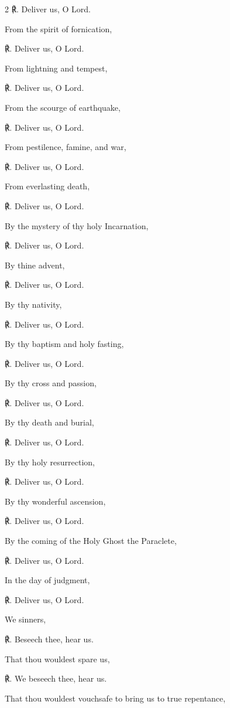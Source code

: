 \begin{multicols}{2}
℟. Deliver us, O Lord.\par\noindent
From the spirit of fornication,\par
℟. Deliver us, O Lord.\par\noindent
From lightning and tempest,\par
℟. Deliver us, O Lord.\par\noindent
From the scourge of earthquake,\par
℟. Deliver us, O Lord.\par\noindent
From pestilence, famine, and war,\par
℟. Deliver us, O Lord.\par\noindent
From everlasting death,\par
℟. Deliver us, O Lord.\par\noindent
By the mystery of thy holy Incarnation,\par
℟. Deliver us, O Lord.\par\noindent
By thine advent,\par
℟. Deliver us, O Lord.\par\noindent
By thy nativity,\par
℟. Deliver us, O Lord.\par\noindent
By thy baptism and holy fasting,\par
℟. Deliver us, O Lord.\par\noindent
By thy cross and passion,\par
℟. Deliver us, O Lord.\par\noindent
By thy death and burial,\par
℟. Deliver us, O Lord.\par\noindent
By thy holy resurrection,\par
℟. Deliver us, O Lord.\par\noindent
By thy wonderful ascension,\par
℟. Deliver us, O Lord.\par\noindent
By the coming of the Holy Ghost the Paraclete,\par
℟. Deliver us, O Lord.\par\noindent
In the day of judgment,\par
℟. Deliver us, O Lord.\par\noindent
We sinners,\par
℟. Beseech thee, hear us.\par\noindent
That thou wouldest spare us,\par
℟. We beseech thee, hear us.\par\noindent
That thou wouldest vouchsafe to bring us to true repentance,\par

\end{multicols}
